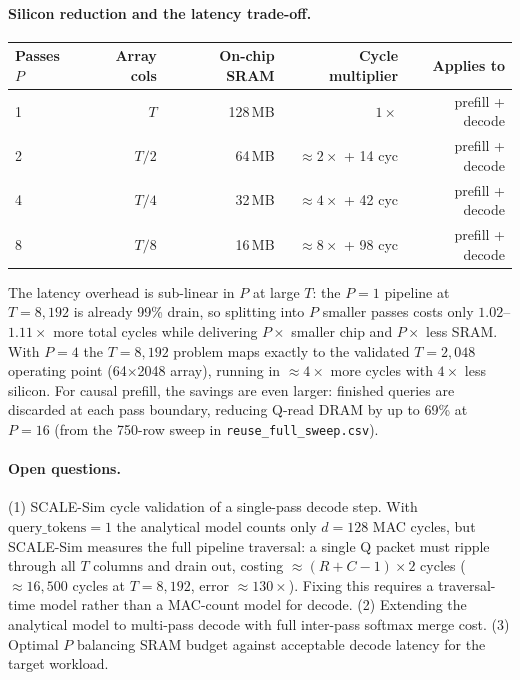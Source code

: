 \documentclass[11pt]{article}
\begin{document}
\paragraph{Silicon reduction and the latency trade-off.}

\begin{center}
\small
\begin{tabular}{lrrrr}
\toprule
Passes $P$ & Array cols & On-chip SRAM & Cycle multiplier & Applies to \\
\midrule
1 & $T$     & 128\,MB & $1\times$              & prefill + decode \\
2 & $T/2$   &  64\,MB & ${\approx}2\times$ + 14 cyc & prefill + decode \\
4 & $T/4$   &  32\,MB & ${\approx}4\times$ + 42 cyc & prefill + decode \\
8 & $T/8$   &  16\,MB & ${\approx}8\times$ + 98 cyc & prefill + decode \\
\bottomrule
\end{tabular}
\end{center}

The latency overhead is sub-linear in $P$ at large $T$: the $P{=}1$ pipeline at
$T{=}8{,}192$ is already 99\% drain, so splitting into $P$ smaller passes costs
only $1.02$--$1.11\times$ more total cycles while delivering $P\times$ smaller
chip and $P\times$ less SRAM.
With $P{=}4$ the $T{=}8{,}192$ problem maps exactly to the validated $T{=}2{,}048$
operating point (64$\times$2048 array), running in ${\approx}4\times$ more cycles
with $4\times$ less silicon.
For causal prefill, the savings are even larger: finished queries are discarded at
each pass boundary, reducing Q-read DRAM by up to 69\% at $P{=}16$
(from the 750-row sweep in \texttt{reuse\_full\_sweep.csv}).

\paragraph{Open questions.}
(1) SCALE-Sim cycle validation of a single-pass decode step.
With $\text{query\_tokens}{=}1$ the analytical model counts only $d{=}128$ MAC cycles,
but SCALE-Sim measures the full pipeline traversal: a single Q packet must ripple
through all $T$ columns and drain out, costing ${\approx}(R{+}C{-}1){\times}2$
cycles (${\approx}16{,}500$ cycles at $T{=}8{,}192$, error ${\approx}130{\times}$).
Fixing this requires a traversal-time model rather than a MAC-count model for decode.
(2) Extending the analytical model to multi-pass decode with full inter-pass
softmax merge cost.
(3) Optimal $P$ balancing SRAM budget against acceptable decode latency for the
target workload.
\end{document}
